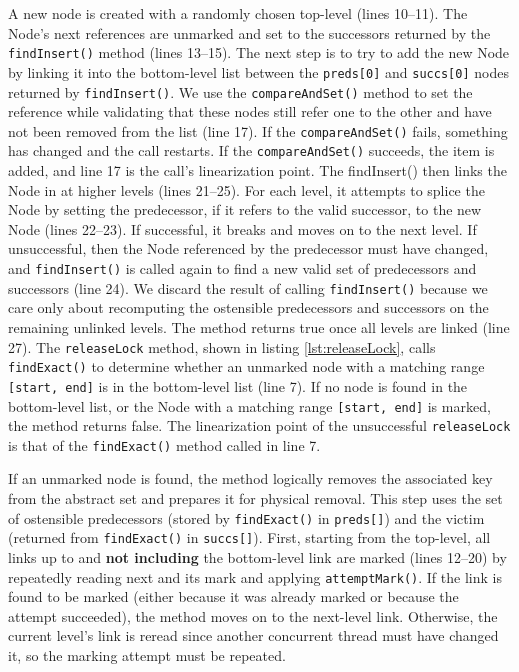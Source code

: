 A new node is created with a randomly chosen top-level (lines 10--11). The Node's next references are unmarked and set to the successors returned by the \texttt{findInsert()} method (lines 13--15).
The next step is to try to add the new Node by linking it into the bottom-level list between the \texttt{preds[0]} and \texttt{succs[0]} nodes returned by \texttt{findInsert()}. We use the \texttt{compareAndSet()} method to set the reference while validating that these nodes still refer one to the other and have not been removed from the list (line 17). If the  \texttt{compareAndSet()} fails, something has changed and the call restarts. If the  \texttt{compareAndSet()} succeeds, the item is added, and line 17 is the call's linearization point.
The {findInsert()} then links the Node in at higher levels (lines 21--25). For each level, it attempts to splice the Node by setting the predecessor, if it refers to the valid successor, to the new Node (lines 22--23). If successful, it breaks and moves on to the next level. If unsuccessful, then the Node referenced by the predecessor must have changed, and \texttt{findInsert()} is called again to find a new valid set of predecessors and successors (line 24). We discard the result of calling \texttt{findInsert()} because we care only about recomputing the ostensible predecessors and successors on the remaining unlinked levels. The method returns true once all levels are linked (line 27).
The \texttt{releaseLock} method, shown in listing \ref{lst:releaseLock}, calls \texttt{findExact()} to determine whether an unmarked node with a matching range \texttt{[start, end]} is in the bottom-level list (line 7). If no node is found in the bottom-level list, or the Node with a matching range \texttt{[start, end]} is marked, the method returns false. The linearization point of the unsuccessful \texttt{releaseLock} is that of the \texttt{findExact()} method called in line 7. 

If an unmarked node is found, the method logically removes the associated key from the abstract set and prepares it for physical removal. This step uses the set of ostensible predecessors (stored by \texttt{findExact()} in \texttt{preds[]}) and the victim (returned from \texttt{findExact()} in \texttt{succs[]}). First, starting from the top-level, all links up to and \textbf{not including} the bottom-level link are marked (lines 12--20) by repeatedly reading next and its mark and applying \texttt{attemptMark()}. If the link is found to be marked (either because it was already marked or because the attempt succeeded), the method moves on to the next-level link. Otherwise, the current level's link is reread since another concurrent thread must have changed it, so the marking attempt must be repeated. 

